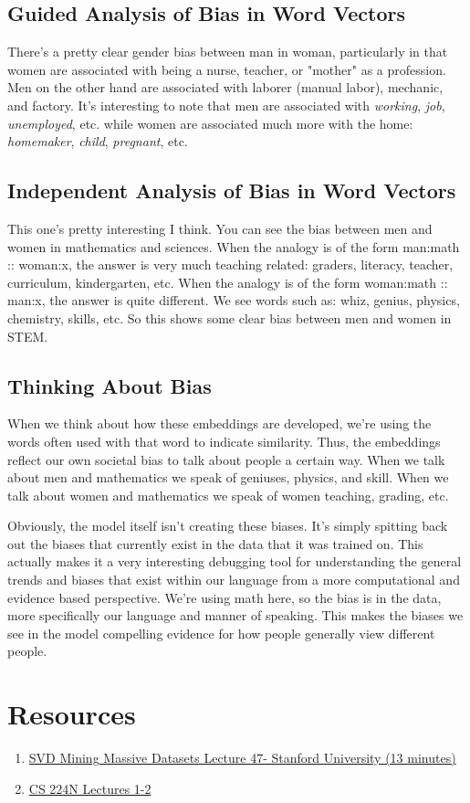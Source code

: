 \documentclass[12pt]{article}
\begin{document}
\subsection{Guided Analysis of Bias in Word Vectors}
There's a pretty clear gender bias between man in woman, particularly in that women are associated
with being a nurse, teacher, or "mother" as a profession. Men on the other hand are associated 
with laborer (manual labor), mechanic, and factory. It's interesting to note that men are associated 
with \emph{working}, \emph{job}, \emph{unemployed}, etc. while women are associated much more 
with the home: \emph{homemaker}, \emph{child}, \emph{pregnant}, etc. 

\subsection{Independent Analysis of Bias in Word Vectors}
This one's pretty interesting I think. You can see the bias between men and women in mathematics 
and sciences. When the analogy is of the form man:math :: woman:x, the answer is very much 
teaching related: graders, literacy, teacher, curriculum, kindergarten, etc. When the analogy is 
of the form woman:math :: man:x, the answer is quite different. We see words such as: whiz, genius, 
physics, chemistry, skills, etc. So this shows some clear bias between men and women in STEM. 

\subsection{Thinking About Bias}
When we think about how these embeddings are developed, we're using the words often used with that
word to indicate similarity. Thus, the embeddings reflect our own societal bias to talk about people
a certain way. When we talk about men and mathematics we speak of geniuses, physics, and skill. When 
we talk about women and mathematics we speak of women teaching, grading, etc.

Obviously, the model itself isn't creating these biases. It's simply spitting back out the biases 
that currently exist in the data that it was trained on. This actually makes it a very interesting 
debugging tool for understanding the general trends and biases that exist within our language from 
a more computational and evidence based perspective. We're using math here, so the bias is in the data, 
more specifically our language and manner of speaking. This makes the biases we see in the model 
compelling evidence for how people generally view different people. 

\section{Resources}
\begin{enumerate}
    \item \href{https://www.youtube.com/watch?v=P5mlg91as1c}{SVD Mining Massive Datasets Lecture 47- Stanford University (13 minutes)}
    \item \href{https://web.stanford.edu/class/cs224n/}{CS 224N Lectures 1-2}
\end{enumerate}
\end{document}
